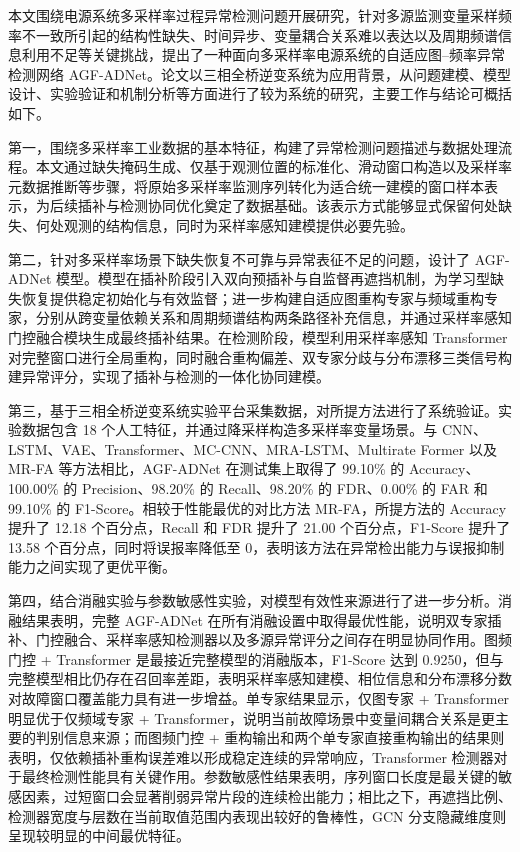 \documentclass[bachelor, vlined]{DissertUESTC}
\begin{document}
        本文围绕电源系统多采样率过程异常检测问题开展研究，针对多源监测变量采样频率不一致所引起的结构性缺失、时间异步、变量耦合关系难以表达以及周期频谱信息利用不足等关键挑战，提出了一种面向多采样率电源系统的自适应图--频率异常检测网络 AGF-ADNet。论文以三相全桥逆变系统为应用背景，从问题建模、模型设计、实验验证和机制分析等方面进行了较为系统的研究，主要工作与结论可概括如下。

        第一，围绕多采样率工业数据的基本特征，构建了异常检测问题描述与数据处理流程。本文通过缺失掩码生成、仅基于观测位置的标准化、滑动窗口构造以及采样率元数据推断等步骤，将原始多采样率监测序列转化为适合统一建模的窗口样本表示，为后续插补与检测协同优化奠定了数据基础。该表示方式能够显式保留何处缺失、何处观测的结构信息，同时为采样率感知建模提供必要先验。

        第二，针对多采样率场景下缺失恢复不可靠与异常表征不足的问题，设计了 AGF-ADNet 模型。模型在插补阶段引入双向预插补与自监督再遮挡机制，为学习型缺失恢复提供稳定初始化与有效监督；进一步构建自适应图重构专家与频域重构专家，分别从跨变量依赖关系和周期频谱结构两条路径补充信息，并通过采样率感知门控融合模块生成最终插补结果。在检测阶段，模型利用采样率感知 Transformer 对完整窗口进行全局重构，同时融合重构偏差、双专家分歧与分布漂移三类信号构建异常评分，实现了插补与检测的一体化协同建模。

        第三，基于三相全桥逆变系统实验平台采集数据，对所提方法进行了系统验证。实验数据包含 18 个人工特征，并通过降采样构造多采样率变量场景。与 CNN、LSTM、VAE、Transformer、MC-CNN、MRA-LSTM、Multirate Former 以及 MR-FA 等方法相比，AGF-ADNet 在测试集上取得了 99.10\% 的 Accuracy、100.00\% 的 Precision、98.20\% 的 Recall、98.20\% 的 FDR、0.00\% 的 FAR 和 99.10\% 的 F1-Score。相较于性能最优的对比方法 MR-FA，所提方法的 Accuracy 提升了 12.18 个百分点，Recall 和 FDR 提升了 21.00 个百分点，F1-Score 提升了 13.58 个百分点，同时将误报率降低至 0，表明该方法在异常检出能力与误报抑制能力之间实现了更优平衡。

        第四，结合消融实验与参数敏感性实验，对模型有效性来源进行了进一步分析。消融结果表明，完整 AGF-ADNet 在所有消融设置中取得最优性能，说明双专家插补、门控融合、采样率感知检测器以及多源异常评分之间存在明显协同作用。图频门控 + Transformer 是最接近完整模型的消融版本，F1-Score 达到 0.9250，但与完整模型相比仍存在召回率差距，表明采样率感知建模、相位信息和分布漂移分数对故障窗口覆盖能力具有进一步增益。单专家结果显示，仅图专家 + Transformer 明显优于仅频域专家 + Transformer，说明当前故障场景中变量间耦合关系是更主要的判别信息来源；而图频门控 + 重构输出和两个单专家直接重构输出的结果则表明，仅依赖插补重构误差难以形成稳定连续的异常响应，Transformer 检测器对于最终检测性能具有关键作用。参数敏感性结果表明，序列窗口长度是最关键的敏感因素，过短窗口会显著削弱异常片段的连续检出能力；相比之下，再遮挡比例、检测器宽度与层数在当前取值范围内表现出较好的鲁棒性，GCN 分支隐藏维度则呈现较明显的中间最优特征。
\end{document}
